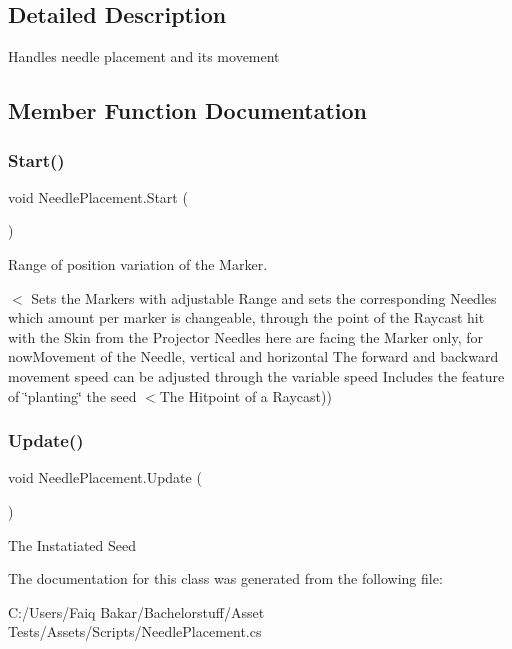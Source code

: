 \subsection{Detailed Description}
Handles needle placement and its movement 



\subsection{Member Function Documentation}
\mbox{\label{class_needle_placement_ae55a927284439c04bf27f75bec13b587}} 
\subsubsection{\texorpdfstring{Start()}{Start()}}
{\footnotesize\ttfamily void Needle\+Placement.\+Start (\begin{DoxyParamCaption}{ }\end{DoxyParamCaption})\hspace{0.3cm}{\ttfamily [private]}}



Range of position variation of the Marker. 

$<$ Sets the Markers with adjustable Range and sets the corresponding Needles which amount per marker is changeable, through the point of the Raycast hit with the Skin from the Projector Needles here are facing the Marker only, for now\+Movement of the Needle, vertical and horizontal The forward and backward movement speed can be adjusted through the variable \textquotesingle{}speed\textquotesingle{} Includes the feature of \char`\"{}planting\char`\"{} the seed $<$The Hitpoint of a Raycast)) \mbox{\label{class_needle_placement_aa41fc424e416e7bfff4ff32a0a95acc1}} 
\subsubsection{\texorpdfstring{Update()}{Update()}}
{\footnotesize\ttfamily void Needle\+Placement.\+Update (\begin{DoxyParamCaption}{ }\end{DoxyParamCaption})\hspace{0.3cm}{\ttfamily [private]}}

The Instatiated Seed 

The documentation for this class was generated from the following file\+:\begin{DoxyCompactItemize}
\item 
C\+:/\+Users/\+Faiq Bakar/\+Bachelorstuff/\+Asset Tests/\+Assets/\+Scripts/Needle\+Placement.\+cs\end{DoxyCompactItemize}
